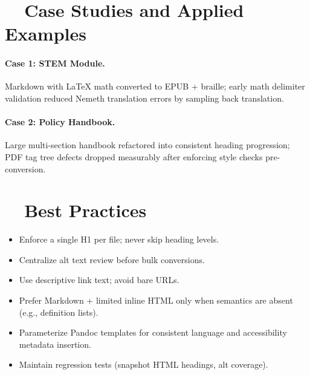 \section{~~Case Studies and Applied Examples}\label{ch19:sec:case-studies}
\paragraph{Case 1: STEM Module.} Markdown with LaTeX math converted to EPUB + braille; early math delimiter validation reduced Nemeth translation errors by sampling back translation.
\paragraph{Case 2: Policy Handbook.} Large multi-section handbook refactored into consistent heading progression; PDF tag tree defects dropped measurably after enforcing style checks pre-conversion.

\section{~~Best Practices}\label{ch19:sec:best-practices}
\begin{itemize}
	\item Enforce a single H1 per file; never skip heading levels.
	\item Centralize alt text review before bulk conversions.
	\item Use descriptive link text; avoid bare URLs.
	\item Prefer Markdown + limited inline HTML only when semantics are absent (e.g., definition lists).
	\item Parameterize Pandoc templates for consistent language and accessibility metadata insertion.
	\item Maintain regression tests (snapshot HTML headings, alt coverage).
\end{itemize}

